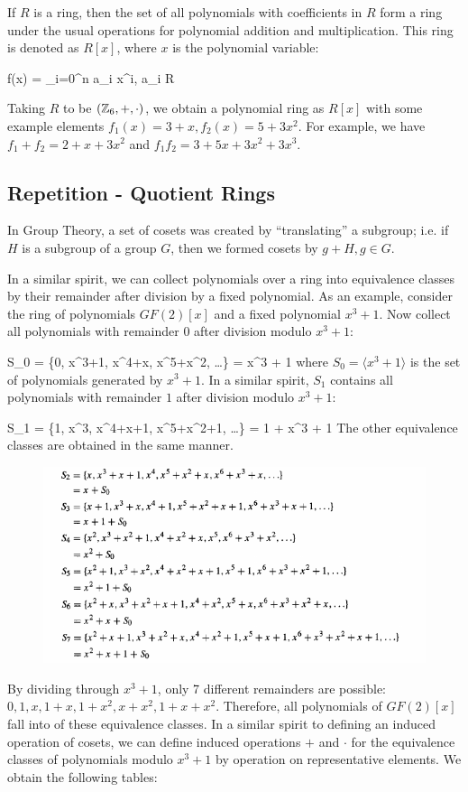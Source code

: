 If $R$ is a ring, then the set of all polynomials with coefficients in $R$ form a ring under the usual operations for polynomial addition and multiplication. This ring is denoted as $R[x]$, where $x$ is the polynomial variable:

\bee
f(x) = \sum_{i=0}^n a_i x^i, a_i \in R
\eee

Taking $R$ to be $(\mathbb{Z}_6, +, \cdot)$, we obtain a polynomial ring as $R[x]$ with some example elements $f_1(x) = 3 + x, f_2(x) = 5 + 3x^2$. For example, we have $f_1 + f_2 = 2 + x + 3x^2$ and $f_1 f_2 = 3 + 5x + 3x^2 + 3x^3$.

\subsection{Repetition - Quotient Rings}

In Group Theory, a set of cosets was created by ``translating'' a subgroup; i.e. if $H$ is a subgroup of a group $G$, then we formed cosets by $g + H, g \in G$.

In a similar spirit, we can collect polynomials over a ring into equivalence classes by their remainder after division by a fixed polynomial.
%
As an example, consider the ring of polynomials $GF(2)[x]$ and a fixed polynomial $x^3+1$. Now collect all polynomials with remainder $0$ after division modulo $x^3+1$:

\bee
S_0 = \{0, x^3+1, x^4+x, x^5+x^2, \ldots\} = \langle x^3 + 1 \rangle
\eee
%
where $S_0 = \langle x^3 + 1 \rangle$ is the set of polynomials generated by $x^3+1$. In a similar spirit, $S_1$ contains all polynomials with remainder $1$ after division modulo $x^3+1$:

\bee
S_1 = \{1, x^3, x^4+x+1, x^5+x^2+1, \ldots\} = 1 + \langle x^3 + 1 \rangle
\eee
%
The other equivalence classes are obtained in the same manner.

\begin{figure}[H]
  \includegraphics[scale=0.75]{images/cyclic_codes_02.png}
\end{figure}
%
By dividing through $x^3+1$, only 7 different remainders are possible: $0, 1, x, 1+x, 1+x^2, x+x^2, 1+x+x^2$. Therefore, all polynomials of $GF(2)[x]$ fall into of these equivalence classes.
%
In a similar spirit to defining an induced operation of cosets, we can define induced operations $+$ and $\cdot$ for the equivalence classes of polynomials modulo $x^3+1$ by operation on representative elements. We obtain the following tables:

